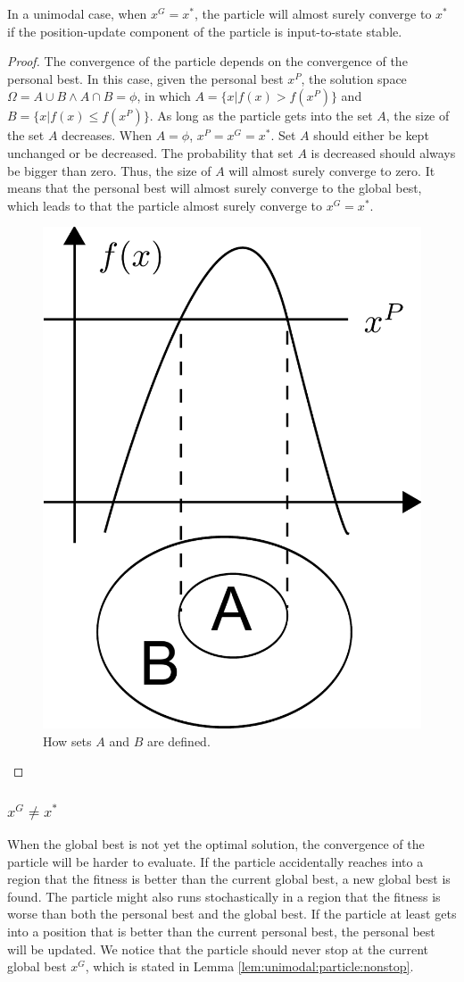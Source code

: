 \begin{mythm}
\label{thm:unimodal:particle:converge}
In a unimodal case, when $ x^{G} = x^{*} $, the particle will almost surely converge to $ x^{*} $ if the position-update component of the particle is input-to-state stable.
\begin{proof}
The convergence of the particle depends on the convergence of the personal best.
In this case, given the personal best $ x^{P} $, the solution space $ \Omega = A \cup B \land A \cap B = \phi $, in which 
$ A = \{ x | f(x) > f(x^{P}) \} $ and $ B = \{ x | f(x) \leq f(x^{P}) \} $.
As long as the particle gets into the set $ A $, the size of the set $ A $ decreases.
When $ A = \phi $, $ x^{P} = x^{G} = x^{*} $.
Set $ A $ should either be kept unchanged or be decreased.
The probability that set $ A $ is decreased should always be bigger than zero.
Thus, the size of $ A $ will almost surely converge to zero.
It means that the personal best will almost surely converge to the global best, which leads to that the particle almost surely converge to $ x^{G}  = x^{*} $.

\begin{figure}[tbph]
\centering
\includegraphics[width=0.4
\linewidth]{./fig/two_sets_split}
\caption{How sets $ A $ and $ B $ are defined.}
\label{fig:two_sets_split}
\end{figure}

\end{proof}
\end{mythm}

\subsubsection{ $ x^{G} \not = x^{*}  $ }

When the global best is not yet the optimal solution, the convergence of the particle will be harder to evaluate.
If the particle accidentally reaches into a region that the fitness is better than the current global best, a new global best is found.
The particle might also runs stochastically in a region that the fitness is worse than both the personal best and the global best.
If the particle at least gets into a position that is better than the current personal best, the personal best will be updated. 
We notice that the particle should never stop at the current global best $ x^{G} $, which is stated in Lemma \ref{lem:unimodal:particle:nonstop}.

